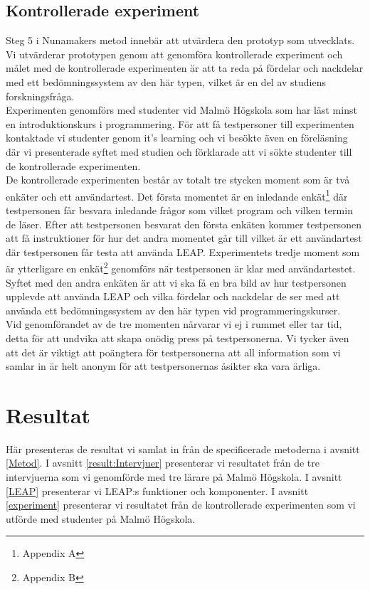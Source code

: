 \documentclass[a4paper,11pt]{article}
\begin{document}
{\subsection{Kontrollerade experiment}\label{Experiment}

Steg 5 i Nunamakers metod innebär att utvärdera den prototyp som utvecklats. Vi utvärderar prototypen genom att genomföra kontrollerade experiment och målet med de kontrollerade experimenten är att ta reda på fördelar och nackdelar med ett bedömningssystem av den här typen, vilket är en del av studiens forskningsfråga. 
\\
Experimenten genomförs med studenter vid Malmö Högskola som har läst minst en introduktionskurs i programmering. För att få testpersoner till experimenten kontaktade vi studenter genom it's learning och vi besökte även en föreläsning där vi presenterade syftet med studien och förklarade att vi sökte studenter till de kontrollerade experimenten.
\\
De kontrollerade experimenten består av totalt tre stycken moment som är två enkäter och ett användartest. Det första momentet är en inledande enkät\footnote{Appendix A} där testpersonen får besvara inledande frågor som vilket program och vilken termin de läser. Efter att testpersonen besvarat den första enkäten kommer testpersonen att få instruktioner för hur det andra momentet går till vilket är ett användartest där testpersonen får testa att använda LEAP. Experimentets tredje moment som är ytterligare en enkät\footnote{Appendix B} genomförs när testpersonen är klar med användartestet. Syftet med den andra enkäten är att vi ska få en bra bild av hur testpersonen upplevde att använda LEAP och vilka fördelar och nackdelar de ser med att använda ett bedömningssystem av den här typen vid programmeringskurser.
\\
Vid genomförandet av de tre momenten närvarar vi ej i rummet eller tar tid, detta för att undvika att skapa onödig press på testpersonerna. Vi tycker även att det är viktigt att poängtera för testpersonerna att all information som vi samlar in är helt anonym för att testpersonernas åsikter ska vara ärliga.

\newpage
\section{Resultat}
Här presenteras de resultat vi samlat in från de specificerade metoderna i avsnitt \ref{Metod}. I avsnitt \ref{result:Intervjuer} presenterar vi resultatet från de tre intervjuerna som vi genomförde med tre lärare på Malmö Högskola. I avsnitt \ref{LEAP} presenterar vi LEAP:s funktioner och komponenter. I avsnitt \ref{experiment} presenterar vi resultatet från de kontrollerade experimenten som vi utförde med studenter på Malmö Högskola.

}
\end{document}
